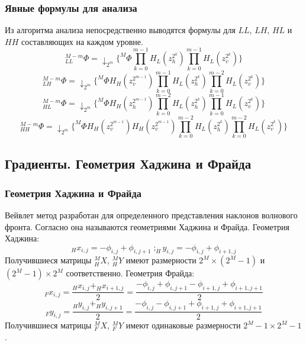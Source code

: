 \documentclass{article}
\begin{document}
\subsubsection{Явные формулы для анализа}
Из алгоритма анализа непосредственно выводятся формулы для $LL$, $LH$, $HL$ и $HH$ составляющих на каждом уровне.
\begin{equation}\label{LL}
_{LL}^{M-m}\Phi=
\downarrow_{2^m} \{^M\Phi\prod\limits_{k = 0}^{m-1} H_L(z_h^{2^k})
							\prod\limits_{k = 0}^{m-1} H_L(z_v^{2^k})\}
\end{equation}
\begin{equation}\label{LH}
_{LH}^{M-m}\Phi=
\downarrow_{2^m} \{^M\Phi H_H(z_v^{2^{m-1}}) \prod\limits_{k = 0}^{m-1} H_L(z_h^{2^k})
							\prod\limits_{k = 0}^{m-2} H_L(z_v^{2^k})\}
\end{equation}
\begin{equation}\label{HL}
_{HL}^{M-m}\Phi=\downarrow_{2^m} \{^M\Phi H_H(z_h^{2^{m-1}}) \prod\limits_{k = 0}^{m-2} H_L(z_h^{2^k})
						\prod\limits_{k = 0}^{m-1} H_L(z_v^{2^k})\}
\end{equation}
\begin{equation}\label{HH}
_{HH}^{M-m}\Phi=\downarrow_{2^m} \{^M\Phi H_H(z_v^{2^{m-1}}) H_H(z_v^{2^{m-1}}) \prod\limits_{k = 0}^{m-2} H_L(z_h^{2^k})
							\prod\limits_{k = 0}^{m-2} H_L(z_v^{2^k})\}
\end{equation}

\subsection{Градиенты. Геометрия Хаджина и Фрайда}
\subsubsection{Геометрия Хаджина и Фрайда}
Вейвлет метод разработан для определенного представления наклонов волнового фронта. Согласно \cite{fourier_1} она называются геометриями Хаджина и Фрайда.
Геометрия Хаджина:
$$_{H}x_{i,j}=-\phi_{i,j}+\phi_{i,j+1}\;;_{H}y_{i,j}=-\phi_{i,j}+\phi_{i+1,j}$$
Получившиеся матрицы $_H^{M}X$, $_H^{M}Y$ имеют размерности $2^M \times(2^M - 1)$ и $(2^M - 1) \times 2^M$ соответственно.
Геометрия Фрайда:
$$_{F}x_{i,j}=\frac{_{H}x_{i,j} + _{H}x_{i+1,j}}{2} = \frac{-\phi_{i,j}+\phi_{i,j+1}-\phi_{i+1,j}+\phi_{i+1,j+1}}{2}$$
$$_{F}y_{i,j}=\frac{_{H}y_{i,j} + _{H}y_{i,j+1}}{2} = \frac{-\phi_{i,j}-\phi_{i,j+1}+\phi_{i+1,j}+\phi_{i+1,j+1}}{2}$$
Получившиеся матрицы $_F^{M}X$, $_F^{M}Y$ имеют одинаковые размерности $2^M - 1 \times 2^M - 1$.
\end{document}
